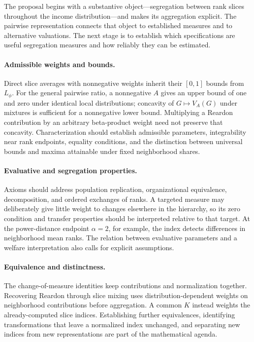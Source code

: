 \documentclass[11pt]{article}
\begin{document}
The proposal begins with a substantive object---segregation between rank slices throughout the income distribution---and makes its aggregation explicit. The pairwise representation connects that object to established measures and to alternative valuations. The next stage is to establish which specifications are useful segregation measures and how reliably they can be estimated.

\paragraph{Admissible weights and bounds.}
Direct slice averages with nonnegative weights inherit their $[0,1]$ bounds from $L_\phi$. For the general pairwise ratio, a nonnegative $A$ gives an upper bound of one and zero under identical local distributions; concavity of $G\mapsto V_A(G)$ under mixtures is sufficient for a nonnegative lower bound. Multiplying a Reardon contribution by an arbitrary beta-product weight need not preserve that concavity. Characterization should establish admissible parameters, integrability near rank endpoints, equality conditions, and the distinction between universal bounds and maxima attainable under fixed neighborhood shares.

\paragraph{Evaluative and segregation properties.}
Axioms should address population replication, organizational equivalence, decomposition, and ordered exchanges of ranks. A targeted measure may deliberately give little weight to changes elsewhere in the hierarchy, so its zero condition and transfer properties should be interpreted relative to that target. At the power-distance endpoint $\alpha=2$, for example, the index detects differences in neighborhood mean ranks. The relation between evaluative parameters and a welfare interpretation also calls for explicit assumptions.

\paragraph{Equivalence and distinctness.}
The change-of-measure identities keep contributions and normalization together. Recovering Reardon through slice mixing uses distribution-dependent weights on neighborhood contributions before aggregation. A common $K$ instead weights the already-computed slice indices. Establishing further equivalences, identifying transformations that leave a normalized index unchanged, and separating new indices from new representations are part of the mathematical agenda.
\end{document}
